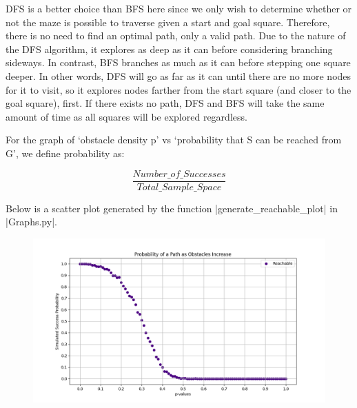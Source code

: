 \documentclass[12pt, twoside]{article}
\newcommand\ddfrac[2]{\frac{\displaystyle #1}{\displaystyle #2}}
\begin{document}
\begin{enumerate}
        \vspace{4mm}
        DFS is a better choice than BFS here since we only wish to determine whether or not the maze is possible to traverse given a start and goal square. Therefore, there is no need to find an optimal path, only a valid path. Due to the nature of the DFS algorithm, it explores as deep as it can before considering branching sideways. In contrast, BFS branches as much as it can before stepping one square deeper. In other words, DFS will go as far as it can until there are no more nodes for it to visit, so it explores nodes farther from the start square (and closer to the goal square), first. If there exists no path, DFS and BFS will take the same amount of time as all squares will be explored regardless.
        
        \vspace{4mm}
        For the graph of `obstacle density p' vs `probability that S can be reached from G', we define probability as:
        \begin{center}
            \[\ddfrac{Number\_of\_Successes}{Total\_Sample\_Space}\]
        \end{center}

        Below is a scatter plot generated by the function \cverb|generate_reachable_plot| in \\ \cverb|Graphs.py|.

        \begin{figure}[h]
            \centering
            \includegraphics[scale = 0.6]{reachable_scatter.png}
        \end{figure}


\end{enumerate}
\end{document}
